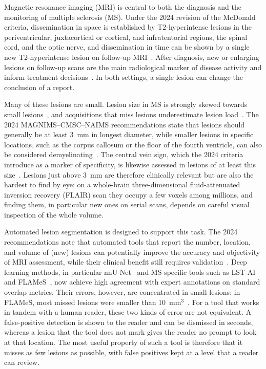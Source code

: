 Magnetic resonance imaging (MRI) is central to both the diagnosis and the
monitoring of multiple sclerosis (MS). Under the 2024 revision of the
McDonald criteria, dissemination in space is established by T2-hyperintense
lesions in the periventricular, juxtacortical or cortical, and
infratentorial regions, the spinal cord, and the optic nerve, and
dissemination in time can be shown by a single new T2-hyperintense lesion on
follow-up MRI~\cite{montalban_diagnosis_2025,barkhof_2024_2025}. After
diagnosis, new or enlarging lesions on follow-up scans are the main
radiological marker of disease activity and inform treatment
decisions~\cite{wattjes_2021_2021}. In both settings, a single lesion can
change the conclusion of a report.

Many of these lesions are small. Lesion size in MS is strongly skewed
towards small lesions~\cite{wang_survey_1997}, and acquisitions that miss
lesions underestimate lesion load~\cite{filippi_quantitative_1996}.
The 2024 MAGNIMS--CMSC--NAIMS recommendations state that lesions should
generally be at least 3~mm in longest diameter, while smaller lesions in
specific locations, such as the corpus callosum or the floor of the fourth
ventricle, can also be considered demyelinating~\cite{barkhof_2024_2025}.
The central vein sign, which the 2024 criteria introduce as a marker of
specificity, is likewise assessed in lesions of at least this
size~\cite{montalban_diagnosis_2025,barkhof_2024_2025}. Lesions just above
3~mm are therefore clinically relevant but are also the hardest to find by
eye: on a whole-brain three-dimensional fluid-attenuated inversion recovery
(FLAIR) scan they occupy a few voxels among millions, and finding them,
in particular new ones on serial scans, depends on careful visual
inspection of the whole volume.

Automated lesion segmentation is designed to support this task. The 2024
recommendations note that automated tools that report the number,
location, and volume of (new) lesions can potentially improve the accuracy
and objectivity of MRI assessment, while their clinical benefit still
requires validation~\cite{barkhof_2024_2025}. Deep learning methods, in
particular nnU-Net~\cite{isensee_nnu-net_2021} and MS-specific tools
such as LST-AI~\cite{wiltgen_lst-ai_2024} and
FLAMeS~\cite{dereskewicz_flames_2025}, now achieve high agreement with
expert annotations on standard overlap metrics. Their errors, however, are
concentrated in small lesions: in FLAMeS, most missed lesions were smaller
than 10~mm$^3$~\cite{dereskewicz_flames_2025}. For a tool that works in
tandem with a human reader, these two kinds of error are not equivalent. A
false-positive detection is shown to the reader and can be dismissed in
seconds, whereas a lesion that the tool does not mark gives the reader no
prompt to look at that location. The most useful property of such a tool
is therefore that it misses as few lesions as possible, with false
positives kept at a level that a reader can review.

